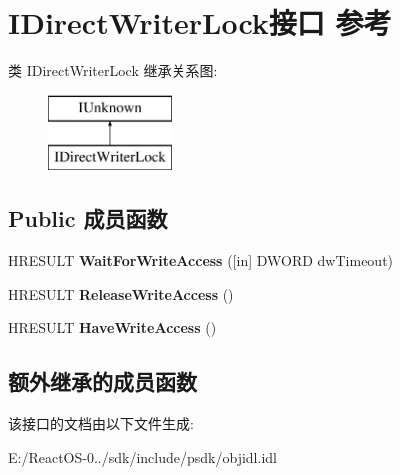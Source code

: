 \hypertarget{interface_i_direct_writer_lock}{}\section{I\+Direct\+Writer\+Lock接口 参考}
\label{interface_i_direct_writer_lock}
类 I\+Direct\+Writer\+Lock 继承关系图\+:\begin{figure}[H]
\begin{center}
\leavevmode
\includegraphics[height=2.000000cm]{interface_i_direct_writer_lock}
\end{center}
\end{figure}
\subsection*{Public 成员函数}
\begin{DoxyCompactItemize}
\item 
\mbox{\label{interface_i_direct_writer_lock_a0de16a59154e9b1077c00f2765e44109}} 
H\+R\+E\+S\+U\+LT {\bfseries Wait\+For\+Write\+Access} (\mbox{[}in\mbox{]} D\+W\+O\+RD dw\+Timeout)
\item 
\mbox{\label{interface_i_direct_writer_lock_a82b1aaabe3789a2060da3b036ed200cc}} 
H\+R\+E\+S\+U\+LT {\bfseries Release\+Write\+Access} ()
\item 
\mbox{\label{interface_i_direct_writer_lock_a43a092b4d7afc511aee43589402a57af}} 
H\+R\+E\+S\+U\+LT {\bfseries Have\+Write\+Access} ()
\end{DoxyCompactItemize}
\subsection*{额外继承的成员函数}


该接口的文档由以下文件生成\+:\begin{DoxyCompactItemize}
\item 
E\+:/\+React\+O\+S-\/0../sdk/include/psdk/objidl.\+idl\end{DoxyCompactItemize}
